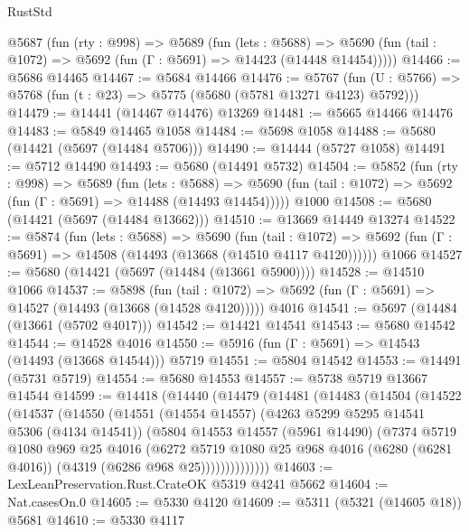 \begin{lexlean}{RustStd}
\begin{coremodule}
  @5687
    (fun (rty : @998) =>
    @5689
      (fun (lets : @5688) =>
      @5690 (fun (tail : @1072) => @5692 (fun (Γ : @5691) => @14423 (@14448 @14454)))))
@14466 := @5686 @14465
@14467 := @5684 @14466
@14476 := @5767
    (fun (U : @5766) => @5768 (fun (t : @23) => @5775 (@5680 (@5781 @13271 @4123) @5792)))
@14479 := @14441 (@14467 @14476) @13269
@14481 := @5665 @14466 @14476
@14483 := @5849 @14465 @1058
@14484 := @5698 @1058
@14488 := @5680 (@14421 (@5697 (@14484 @5706)))
@14490 := @14444 (@5727 @1058)
@14491 := @5712 @14490
@14493 := @5680 (@14491 @5732)
@14504 := @5852
    (fun (rty : @998) =>
    @5689
      (fun (lets : @5688) =>
      @5690 (fun (tail : @1072) => @5692 (fun (Γ : @5691) => @14488 (@14493 @14454)))))
    @1000
@14508 := @5680 (@14421 (@5697 (@14484 @13662)))
@14510 := @13669 @14449 @13274
@14522 := @5874
    (fun (lets : @5688) =>
    @5690
      (fun (tail : @1072) =>
      @5692 (fun (Γ : @5691) => @14508 (@14493 (@13668 (@14510 @4117 @4120))))))
    @1066
@14527 := @5680 (@14421 (@5697 (@14484 (@13661 @5900))))
@14528 := @14510 @1066
@14537 := @5898
    (fun (tail : @1072) => @5692 (fun (Γ : @5691) => @14527 (@14493 (@13668 (@14528 @4120)))))
    @4016
@14541 := @5697 (@14484 (@13661 (@5702 @4017)))
@14542 := @14421 @14541
@14543 := @5680 @14542
@14544 := @14528 @4016
@14550 := @5916 (fun (Γ : @5691) => @14543 (@14493 (@13668 @14544))) @5719
@14551 := @5804 @14542
@14553 := @14491 (@5731 @5719)
@14554 := @5680 @14553
@14557 := @5738 @5719 @13667 @14544
@14599 := @14418
    (@14440
      (@14479
        (@14481
          (@14483
            (@14504
              (@14522
                (@14537
                  (@14550
                    (@14551
                      (@14554 @14557)
                      (@4263 @5299 @5295 @14541 @5306 (@4134 @14541))
                      (@5804
                        @14553
                        @14557
                        (@5961 @14490)
                        (@7374
                          @5719
                          @1080
                          @969
                          @25
                          @4016
                          (@6272
                            @5719
                            @1080
                            @25
                            @968
                            @4016
                            (@6280 (@6281 @4016))
                            (@4319 (@6286 @968 @25))))))))))))))
@14603 := LexLeanPreservation.Rust.CrateOK @5319 @4241 @5662
@14604 := Nat.casesOn.{0}
@14605 := @5330 @4120
@14609 := @5311 (@5321 (@14605 @18)) @5681
@14610 := @5330 @4117

\end{coremodule}
\end{lexlean}
